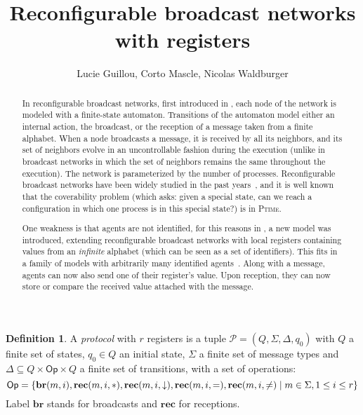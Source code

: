 \documentclass{article}
\title{Reconfigurable broadcast networks with registers}
\author{Lucie Guillou, Corto Mascle, Nicolas Waldburger}
\date{}
\newcommand{\set}[1]{\{#1\}}
\theoremstyle{definition}
\newtheorem{definition}[theorem]{Definition}
\begin{document}
	
	\maketitle
	
	\begin{abstract}
			In reconfigurable broadcast networks, first introduced in \cite{DelzannoSZ2010Adhoc}, each node of the network is modeled with a finite-state automaton. Transitions of the automaton model either an internal action, the broadcast, or the reception of a message taken from a finite alphabet. When a node broadcasts a message, it is received by all its neighbors, and its set of neighbors evolve in an uncontrollable fashion during the execution (unlike in broadcast networks \cite{BZ83} in which the set of neighbors remains the same throughout the execution). The network is parameterized by the number of processes. Reconfigurable broadcast networks have been widely studied in the past years~\cite{Balasubramanian18, BalasubramanianGW22}, and it is well known that the coverability problem (which asks: given a special state, can we reach a configuration in which one process is in this special state?) is in \textsc{Ptime}.
		
		One weakness is that agents are not identified, for this reasons in \cite{DelzannoST13}, a new model was introduced, extending reconfigurable broadcast networks with local registers containing values from an \emph{infinite} alphabet (which can be seen as a set of identifiers). This fits in a family of models with arbitrarily many identified agents~\cite{AbdullaAKR14}. Along with a message, agents can now also send one of their register's value. Upon reception, they can now store or compare the received value attached with the message.
	\end{abstract}

	
	
	\begin{definition}
		A \emph{protocol} with $r$ registers is a tuple $\mathcal{P} = (Q, \Sigma, \Delta, q_0)$  with $Q$ a finite set of states, $q_0 \in Q$ an initial state, $\Sigma$ a finite set of message types  and $\Delta \subseteq Q \times \mathsf{Op} \times Q$ a finite set of transitions, with a set of operations:\vspace{-0.3cm} \[\mathsf{Op} = \set{\mathbf{br}(m,i), \mathbf{rec}(m,i, \ast), \mathbf{rec}(m,i, \downarrow), \mathbf{rec}(m,i, =),\mathbf{rec}(m,i, \neq) \mid m \in \Sigma, 1 \leq i \leq r}\vspace{-0.3cm}\]
		Label $\mathbf{br}$ stands for broadcasts and $\mathbf{rec}$ for receptions.
		
	\end{definition}
	
\end{document}

